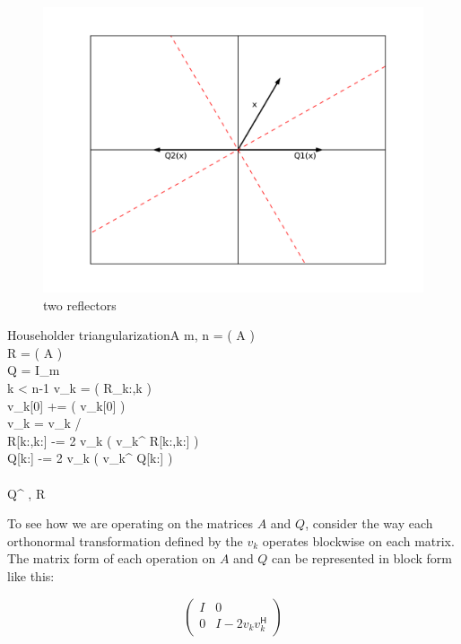 \begin{figure}
	\centering
	\includegraphics[width= \textwidth]{fig2}
	\caption{two reflectors}
	\label{fig:two reflectors}
\end{figure}

\begin{pseudo}{Householder triangularization}{A}
\label{Alg:Householder}
m, n =  \left( A \right) \\
R =  \left( A \right) \\
Q = I_m \\
 \leq k < n-1
\DO
\BEGIN
   v_k =  \left( R_{k:,k} \right) \\
   v_k[0] +=  \left( v_k[0] \right)  \\
   v_k = v_k /  \\
   R[k:,k:] -= 2 v_k \left( v_k^ R[k:,k:] \right) \\
   Q[k:] -= 2 v_k \left( v_k^ Q[k:] \right) \\
\END \\
 Q^ , R
\end{pseudo}

To see how we are operating on the matrices $A$ and $Q$, consider the way each orthonormal transformation defined by the $v_k$ operates blockwise on each matrix.
The matrix form of each operation on $A$ and $Q$ can be represented in block form like this:

\[
\begin{pmatrix}
I & 0 \\
0 & I - 2 v_k v_k^\mathsf{H}
\end{pmatrix}
\]

